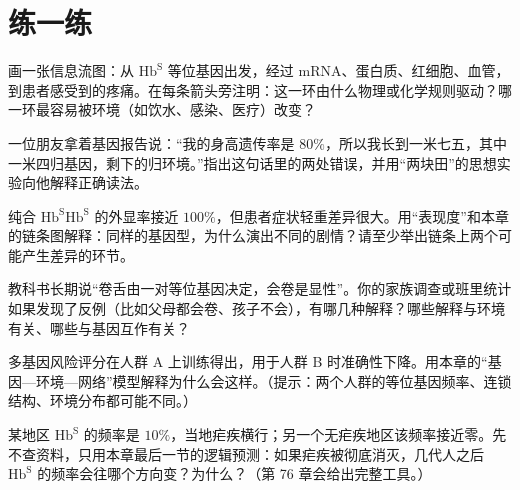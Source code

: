 \section*{练一练}

\begin{sikaoti}
\item 画一张信息流图：从 $\mathrm{Hb^{S}}$ 等位基因出发，经过 mRNA、蛋白质、红细胞、血管，到患者感受到的疼痛。在每条箭头旁注明：这一环由什么物理或化学规则驱动？哪一环最容易被环境（如饮水、感染、医疗）改变？
\item 一位朋友拿着基因报告说：“我的身高遗传率是 $80\%$，所以我长到一米七五，其中一米四归基因，剩下的归环境。”指出这句话里的两处错误，并用“两块田”的思想实验向他解释正确读法。
\item 纯合 $\mathrm{Hb^{S}Hb^{S}}$ 的外显率接近 $100\%$，但患者症状轻重差异很大。用“表现度”和本章的链条图解释：同样的基因型，为什么演出不同的剧情？请至少举出链条上两个可能产生差异的环节。
\item 教科书长期说“卷舌由一对等位基因决定，会卷是显性”。你的家族调查或班里统计如果发现了反例（比如父母都会卷、孩子不会），有哪几种解释？哪些解释与环境有关、哪些与基因互作有关？
\item 多基因风险评分在人群 A 上训练得出，用于人群 B 时准确性下降。用本章的“基因—环境—网络”模型解释为什么会这样。（提示：两个人群的等位基因频率、连锁结构、环境分布都可能不同。）
\item 某地区 $\mathrm{Hb^{S}}$ 的频率是 $10\%$，当地疟疾横行；另一个无疟疾地区该频率接近零。先不查资料，只用本章最后一节的逻辑预测：如果疟疾被彻底消灭，几代人之后 $\mathrm{Hb^{S}}$ 的频率会往哪个方向变？为什么？（第 76 章会给出完整工具。）
\end{sikaoti}
